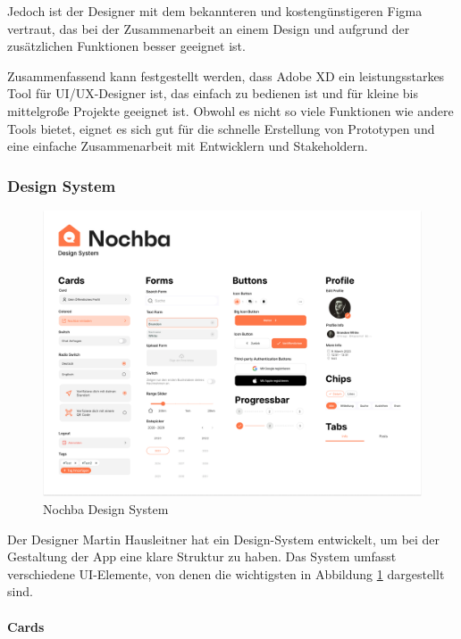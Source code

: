 Jedoch ist der Designer mit
dem bekannteren und kostengünstigeren Figma vertraut, das
bei der Zusammenarbeit an einem Design und aufgrund der
zusätzlichen Funktionen besser geeignet ist.

Zusammenfassend kann festgestellt werden, dass Adobe XD ein leistungsstarkes Tool für UI/UX-Designer ist, das einfach zu bedienen ist und für kleine bis mittelgroße Projekte geeignet ist. Obwohl es nicht so viele Funktionen wie andere Tools bietet, eignet es sich gut für die schnelle Erstellung von Prototypen und eine einfache Zusammenarbeit mit Entwicklern und Stakeholdern.

\subsubsection{Design System}
\begin{figure}[h]
  \centering
  \includegraphics[width=1\textwidth]{pics/design-system.png}
  \caption{Nochba Design System}
  \label{fig:design-system}
\end{figure}

Der Designer Martin Hausleitner hat ein Design-System
entwickelt, um bei der Gestaltung der App eine klare
Struktur zu haben. Das System umfasst verschiedene
UI-Elemente, von denen die wichtigsten in Abbildung
\ref{fig:design-system} dargestellt sind.

\paragraph{Cards}\mbox{} \\

